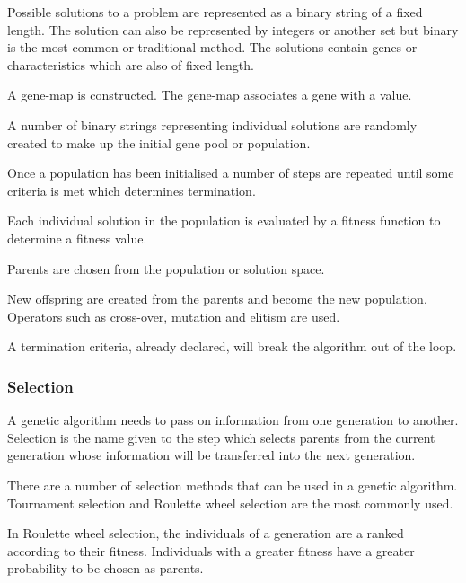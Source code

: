 \documentclass[11pt, a4paper]{article}
\numberwithin{figure}{section}
\numberwithin{table}{section}
\begin{document}
\begin{description}
  \item[Representation of solution:] 
	Possible solutions to a problem are represented as a binary string of a fixed length. 
	The solution can also be represented by integers or another set but 
    binary is the most common or traditional method. 
	The solutions contain genes or characteristics which are also of fixed length.
  \item[Construction of a gene-map:] 
	A gene-map is constructed. The gene-map associates a gene with a value.
  \item[Initialisation of the population:] 
	A number of binary strings representing individual solutions are randomly 
	created to make up the initial gene pool or population.
  \item Once a population has been initialised a number of steps are repeated until 
	some criteria is met which determines termination.
  \item[Evaluation:] 
	Each individual solution in the population is evaluated by a fitness 
	function to determine a fitness value.
  \item[Selection of parents:] 
	Parents are chosen from the population or solution space.
  \item[Reproduction:] 
	New offspring are created from the parents and become the new population. 
	Operators such as cross-over, mutation and elitism are used.
  \item[Termination criteria:] 
	A termination criteria, already declared, will break the algorithm out of the loop.
\end{description}

\subsubsection{Selection}

A genetic algorithm needs to pass on information from one generation to 
another. Selection is the name given to the step which selects parents from the
current generation whose information will be transferred into the next 
generation.

There are a number of selection methods that can be used in a genetic algorithm.
Tournament selection and Roulette wheel selection are the most commonly used.

In Roulette wheel selection, the individuals of a generation are a ranked 
according to their fitness. Individuals with a greater fitness have a greater 
probability to be chosen as parents.
\end{document}
